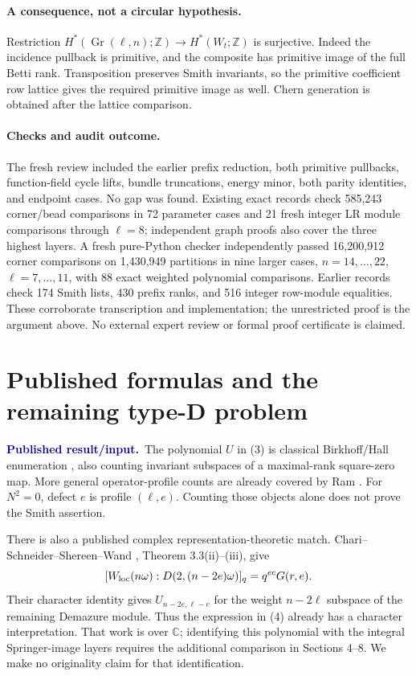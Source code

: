 \documentclass[11pt,letterpaper]{article}
\newcommand{\Z}{\mathbb Z}
\newcommand{\C}{\mathbb C}
\newcommand{\Gr}{\operatorname{Gr}}
\newcommand{\published}{\textcolor{navy}{\textbf{Published result/input.}}\ }
\begin{document}
\paragraph{A consequence, not a circular hypothesis.}
Restriction \(H^*(\Gr(\ell,n);\Z)\to H^*(W_t;\Z)\) is surjective.
Indeed the incidence pullback is primitive, and the composite has
primitive image of the full Betti rank.
Transposition preserves Smith invariants, so the primitive coefficient
row lattice gives the required primitive image as well.
Chern generation is obtained after the lattice comparison.

\paragraph{Checks and audit outcome.}
The fresh review included the earlier prefix reduction, both primitive
pullbacks, function-field cycle lifts, bundle truncations, energy minor,
both parity identities, and endpoint cases. No gap was found.
Existing exact records check 585,243 corner/bead comparisons in 72
parameter cases and 21 fresh integer LR module comparisons through
\(\ell=8\); independent graph proofs also cover the three highest
layers. A fresh pure-Python checker independently passed 16,200,912
corner comparisons on 1,430,949 partitions in nine larger cases,
\(n=14,\ldots,22\), \(\ell=7,\ldots,11\), with 88 exact weighted
polynomial comparisons. Earlier records check 174 Smith lists,
430 prefix ranks, and 516 integer row-module equalities.
These corroborate transcription and implementation; the unrestricted
proof is the argument above.
No external expert review or formal proof certificate is claimed.

\newpage
\section{Published formulas and the remaining type-D problem}
\published The polynomial \(U\) in (3) is classical Birkhoff/Hall
enumeration \cite{Birkhoff,Sage}, also counting invariant subspaces of
a maximal-rank square-zero map.
More general operator-profile counts are already covered by Ram
\cite{Ram}. For \(N^2=0\), defect \(e\) is profile \((\ell,e)\).
Counting those objects alone does not prove the Smith assertion.

There is also a published complex representation-theoretic match.
Chari--Schneider--Shereen--Wand \cite{CSSW},
Theorem 3.3(ii)--(iii), give
\[
 [W_{\rm loc}(n\omega):D(2,(n-2e)\omega)]_q=q^{ec}G(r,e).
\]
Their character identity gives \(U_{n-2e,\ell-e}\) for the weight
\(n-2\ell\) subspace of the remaining Demazure module.
Thus the expression in (4) already has a character interpretation.
That work is over \(\C\); identifying this polynomial with the
integral Springer-image layers requires the additional comparison in
Sections 4--8. We make no originality claim for that identification.
\end{document}
